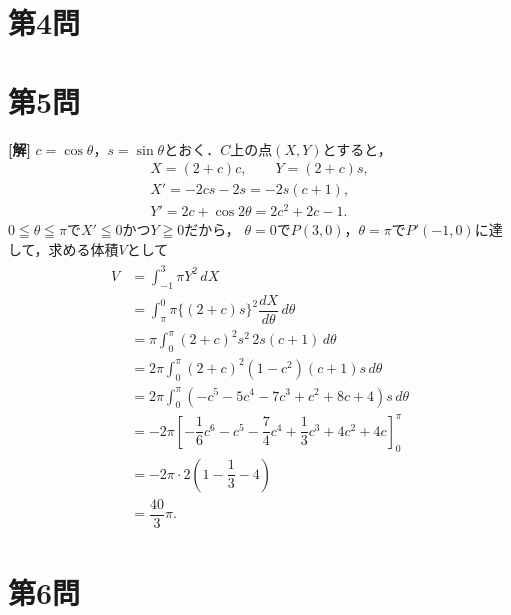 \documentclass[../main.tex]{subfiles}
\begin{document}
\section*{第4問}

\newpage
\newpage

\section*{第5問}

{\bf [解]}
$c=\cos\theta$，$s=\sin\theta$とおく．$C$上の点$(X,Y)$とすると，
\begin{align}
  X=(2+c)c,\qquad Y=(2+c)s,\\
  X'=-2cs-2s=-2s(c+1),\\
  Y'=2c+\cos2\theta=2c^2+2c-1.
\end{align}
$0\leqq\theta\leqq\pi$で$X'\leqq0$かつ$Y\geqq0$だから，
$\theta=0$で$P(3,0)$，$\theta=\pi$で$P'(-1,0)$に達して，求める体積$V$として
\begin{align}
  \begin{split}
    V&=\int_{-1}^3\pi Y^2\,dX\\
    &=\int_{\pi}^0\pi\{(2+c)s\}^2\dfrac{dX}{d\theta}\,d\theta\\
    &=\pi\int_0^\pi(2+c)^2s^2\,2s(c+1)\,d\theta\\
    &=2\pi\int_0^\pi(2+c)^2(1-c^2)(c+1)s\,d\theta\\
    &=2\pi\int_0^\pi(-c^5-5c^4-7c^3+c^2+8c+4)s\,d\theta\\
    &=-2\pi\left[-\dfrac{1}{6}c^6-c^5-\dfrac{7}{4}c^4
    +\dfrac{1}{3}c^3+4c^2+4c\right]_0^\pi\\
    &=-2\pi\cdot2\left(1-\dfrac{1}{3}-4\right)\\
    &=\dfrac{40}{3}\pi.
  \end{split}
\end{align}
\newpage

\section*{第6問}

\newpage
\newpage
\end{document}
